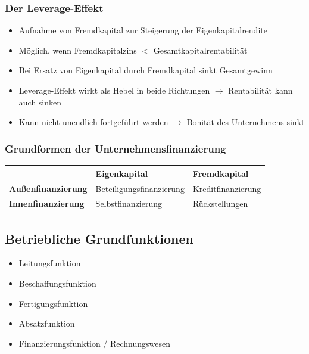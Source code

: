 \documentclass[titlepage,parskip=half]{scrartcl}
\begin{document}
\subsubsection{Der Leverage-Effekt}
\begin{itemize}
    \item Aufnahme von Fremdkapital zur Steigerung der Eigenkapitalrendite
    \item Möglich, wenn Fremdkapitalzins $<$ Gesamtkapitalrentabilität
    \item Bei Ersatz von Eigenkapital durch Fremdkapital sinkt Gesamtgewinn
    \item Leverage-Effekt wirkt als Hebel in beide Richtungen $\rightarrow$ Rentabilität kann auch sinken
    \item Kann nicht unendlich fortgeführt werden $\rightarrow$ Bonität des Unternehmens sinkt
\end{itemize}

\subsubsection{Grundformen der Unternehmensfinanzierung}
\begin{tabular}{|l|l|l|}\hline
    & \textbf{Eigenkapital} & \textbf{Fremdkapital} \\ \hline
    \textbf{Außenfinanzierung} & Beteiligungsfinanzierung & Kreditfinanzierung \\ \hline
    \textbf{Innenfinanzierung} & Selbstfinanzierung & Rückstellungen \\ \hline
\end{tabular}

\subsection{Betriebliche Grundfunktionen}
\begin{itemize}
    \item Leitungsfunktion
    \item Beschaffungsfunktion
    \item Fertigungsfunktion
    \item Absatzfunktion
    \item Finanzierungsfunktion / Rechnungswesen
\end{itemize}
\end{document}
